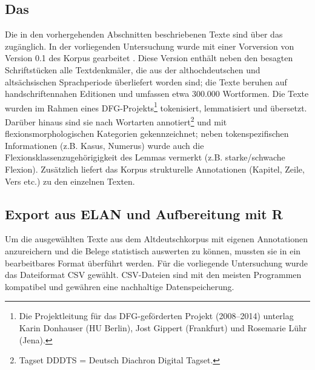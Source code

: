 \subsection{Das } \label{sec:ddd}

Die in den vorhergehenden Abschnitten beschriebenen Texte sind über das  \parencite{Donhauser2015} zugänglich. In der vorliegenden Untersuchung wurde mit einer Vorversion von Version 0.1 des Korpus gearbeitet \parencite{Donhauser2014}. Diese Version enthält neben den besagten Schriftstücken alle Textdenkmäler, die aus der althochdeutschen und altsächsischen Sprachperiode überliefert worden sind; die Texte beruhen auf handschriftennahen Editionen und umfassen etwa 300.000 Wortformen.
Die Texte wurden im Rahmen eines DFG-Projekts\footnote{Die Projektleitung für das DFG-geförderten Projekt (2008--2014) unterlag Karin Donhauser (HU Berlin), Jost Gippert (Frankfurt) und Rosemarie Lühr (Jena).} tokenisiert, lemmatisiert und übersetzt. Darüber hinaus sind sie nach Wortarten annotiert\footnote{Tagset DDDTS = Deutsch Diachron Digital Tagset.} und mit flexionsmorphologischen Kategorien gekennzeichnet; neben tokenspezifischen Informationen (z.B. Kasus, Numerus) wurde auch die Flexionsklassenzugehörigigkeit des Lemmas vermerkt (z.B. starke/schwache Flexion). Zusätzlich liefert das Korpus strukturelle Annotationen (Kapitel, Zeile, Vers etc.) zu den einzelnen Texten. 


\subsection{Export aus ELAN und Aufbereitung mit R}\label{sec:aufbereitung}

Um die ausgewählten Texte aus dem Altdeutschkorpus mit eigenen Annotationen anzureichern und die Belege  statistisch auswerten zu können, mussten sie in ein bearbeitbares Format überführt werden. Für die vorliegende Untersuchung wurde das Dateiformat CSV gewählt. CSV-Dateien sind mit den meisten Programmen kompatibel und gewähren eine nachhaltige Datenspeicherung. 

